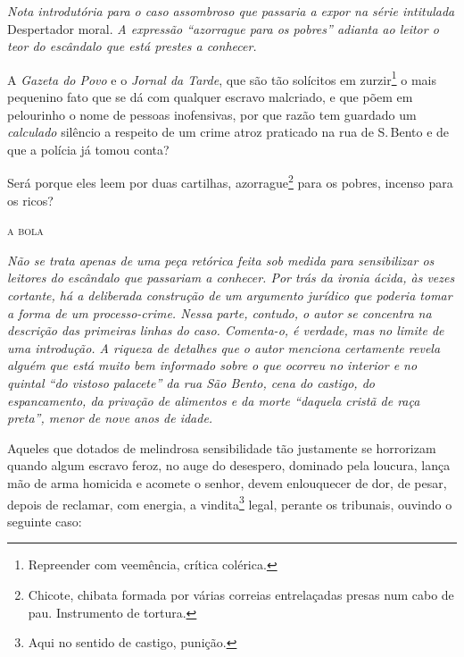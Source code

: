 {\begin{resumo}
\emph{Nota introdutória para o caso assombroso que passaria a expor na
série intitulada} Despertador moral. \emph{A expressão ``azorrague para
os pobres'' adianta ao leitor o teor do escândalo que está prestes a
conhecer. }
\end{resumo}

A \emph{Gazeta do Povo} e o \emph{Jornal da Tarde}, que são tão
solícitos em zurzir\footnote{Repreender com veemência, crítica
  colérica.} o mais pequenino fato que se dá com qualquer escravo
malcriado, e que põem em pelourinho o nome de pessoas inofensivas, por
que razão tem guardado um \emph{calculado} silêncio a respeito de um
crime atroz praticado na rua de S.\,Bento e de que a polícia já tomou
conta?

Será porque eles leem por duas cartilhas, azorrague\footnote{Chicote,
  chibata formada por várias correias entrelaçadas presas num cabo de
  pau. Instrumento de tortura.}
para os pobres, incenso
para os ricos?\medskip

\hfill\textsc{a bola}


\begin{resumo}
\emph{Não se trata apenas de uma peça retórica feita sob medida para
sensibilizar os leitores do escândalo que passariam a conhecer. Por trás
da ironia ácida, às vezes cortante, há a deliberada construção de um
argumento jurídico que poderia tomar a forma de um processo-crime. Nessa
parte, contudo, o autor se concentra na descrição das primeiras linhas
do caso. Comenta-o, é verdade, mas no limite de uma introdução. A
riqueza de detalhes que o autor menciona certamente revela alguém que
está muito bem informado sobre o que ocorreu no interior e no quintal
``do vistoso palacete'' da rua São Bento, cena do castigo, do
espancamento, da privação de alimentos e da morte ``daquela cristã de
raça preta'', menor de nove anos de idade. }
\end{resumo}

Aqueles que dotados de melindrosa sensibilidade tão justamente se
horrorizam quando algum escravo feroz, no auge do desespero, dominado
pela loucura, lança mão de arma homicida e acomete o senhor, devem
enlouquecer de dor, de pesar, depois de reclamar, com energia, a
vindita\footnote{Aqui no sentido de castigo, punição.} legal, perante
os tribunais, ouvindo o seguinte caso:

}
